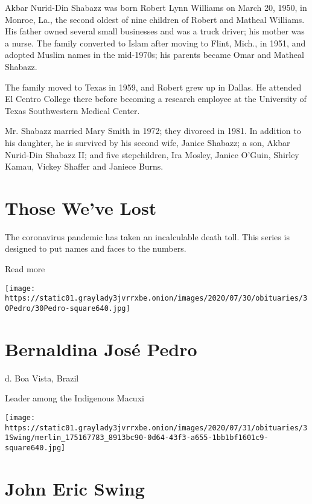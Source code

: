 Akbar Nurid-Din Shabazz was born Robert Lynn Williams on March 20, 1950,
in Monroe, La., the second oldest of nine children of Robert and Matheal
Williams. His father owned several small businesses and was a truck
driver; his mother was a nurse. The family converted to Islam after
moving to Flint, Mich., in 1951, and adopted Muslim names in the
mid-1970s; his parents became Omar and Matheal Shabazz.

The family moved to Texas in 1959, and Robert grew up in Dallas. He
attended El Centro College there before becoming a research employee at
the University of Texas Southwestern Medical Center.

Mr. Shabazz married Mary Smith in 1972; they divorced in 1981. In
addition to his daughter, he is survived by his second wife, Janice
Shabazz; a son, Akbar Nurid-Din Shabazz II; and five stepchildren, Ira
Mosley, Janice O'Guin, Shirley Kamau, Vickey Shaffer and Janiece Burns.

\href{https://www.nytimes3xbfgragh.onion/interactive/2020/obituaries/people-died-coronavirus-obituaries.html?action=click\&pgtype=Article\&state=default\&region=BELOW_MAIN_CONTENT\&context=covid_obits_promo}{}

\hypertarget{those-weve-lost}{%
\section{Those We've Lost}\label{those-weve-lost}}

The coronavirus pandemic has taken an incalculable death toll. This
series is designed to put names and faces to the numbers.

Read more

\texttt{[image: https://static01.graylady3jvrrxbe.onion/images/2020/07/30/obituaries/30Pedro/30Pedro-square640.jpg]}

\hypertarget{bernaldina-josuxe9-pedro}{%
\section{Bernaldina José Pedro}\label{bernaldina-josuxe9-pedro}}

d. Boa Vista, Brazil

Leader among the Indigenous Macuxi

\texttt{[image: https://static01.graylady3jvrrxbe.onion/images/2020/07/31/obituaries/31Swing/merlin\_175167783\_8913bc90-0d64-43f3-a655-1bb1bf1601c9-square640.jpg]}

\hypertarget{john-eric-swing}{%
\section{John Eric Swing}\label{john-eric-swing}}

